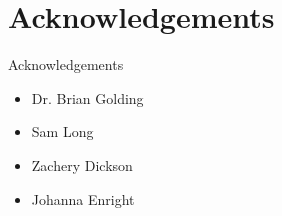 \documentclass{beamer}
\begin{document}
	\section{Acknowledgements}
	\begin{frame}{Acknowledgements}
		\begin{itemize}
			\item Dr. Brian Golding \newline
			\item Sam Long \newline
			\item Zachery Dickson \newline
			\item Johanna Enright
		\end{itemize}
	\end{frame}
		
	
\end{document}
